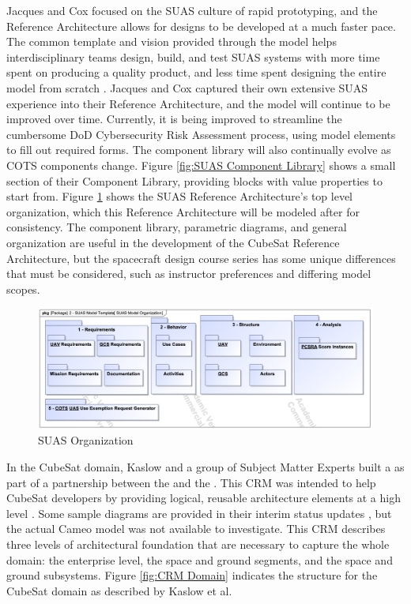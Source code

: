 Jacques and Cox focused on the SUAS culture of rapid prototyping, and the Reference Architecture allows for designs to be developed at a much faster pace. The common template and vision provided through the model helps interdisciplinary teams design, build, and test SUAS systems with more time spent on producing a quality product, and less time spent designing the entire model from scratch \citep{Jacques2019}. Jacques and Cox captured their own extensive SUAS experience into their Reference Architecture, and the model will continue to be improved over time. Currently, it is being improved to streamline the cumbersome DoD Cybersecurity Risk Assessment process, using model elements to fill out required forms. The component library will also continually evolve as COTS components change. Figure \ref{fig:SUAS Component Library} shows a small section of their Component Library, providing blocks with value properties to start from. Figure \ref{fig:SUAS Organization} shows the SUAS Reference Architecture's top level organization, which this Reference Architecture will be modeled after for consistency. The component library, parametric diagrams, and general organization are useful in the development of the CubeSat Reference Architecture, but the spacecraft design course series has some unique differences that must be considered, such as instructor preferences and differing model scopes. 

\begin{figure}
    \centering
    \includegraphics[width=\textwidth]{Thesis/Literature_Review/Lit Review Figures/suas organization.png}
    \caption{SUAS Organization}
    \label{fig:SUAS Organization}
\end{figure}

In the CubeSat domain, Kaslow and a group of Subject Matter Experts built a  as part of a partnership between the  and the . This CRM was intended to help CubeSat developers by providing logical, reusable architecture elements at a high level \citep{Kaslow2016}. Some sample diagrams are provided in their interim status updates \citep{CRM20,Kaslow2014,Kaslow2016,Kaslow2017,Kaslow2020,KaslowCRM3}, but the actual Cameo model was not available to investigate. This CRM describes three levels of architectural foundation that are necessary to capture the whole domain: the enterprise level, the space and ground segments, and the space and ground subsystems. Figure \ref{fig:CRM Domain} indicates the structure for the CubeSat domain as described by Kaslow et al.


